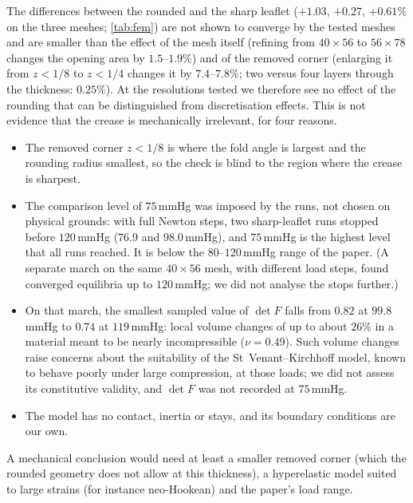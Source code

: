 \documentclass[11pt,a4paper]{article}
\theoremstyle{plain}
\theoremstyle{remark}
\begin{document}
The differences between the rounded and the sharp leaflet ($+1.03$, $+0.27$, $+0.61\%$ on the three meshes;
\cref{tab:fem}) are not shown to converge by the tested meshes and are smaller than the effect of the mesh itself (refining
from $40\times56$ to $56\times78$ changes the opening area by $1.5$--$1.9\%$) and of the removed corner (enlarging it from
$z<1/8$ to $z<1/4$ changes it by $7.4$--$7.8\%$; two versus four layers through the thickness: $0.25\%$). At the resolutions
tested we therefore see no effect of the rounding that can be distinguished from discretisation effects. This is not
evidence that the crease is mechanically irrelevant, for four reasons.
\begin{itemize}
\item The removed corner $z<1/8$ is where the fold angle is largest and the rounding radius smallest, so the check is blind
  to the region where the crease is sharpest.
\item The comparison level of $75$\,mmHg was imposed by the runs, not chosen on physical grounds: with full Newton steps,
  two sharp-leaflet runs stopped before $120$\,mmHg ($76.9$ and $98.0$\,mmHg), and $75$\,mmHg is the highest level that
  all runs reached. It is below the $80$--$120$\,mmHg range of the paper. (A separate march on the same $40\times56$ mesh,
  with different load steps, found converged equilibria up to $120$\,mmHg; we did not analyse the stops further.)
\item On that march, the smallest sampled value of $\det F$ falls from $0.82$ at $99.8$\,mmHg to $0.74$ at $119$\,mmHg:
  local volume changes of up to about $26\%$ in a material meant to be nearly incompressible ($\nu=0.49$). Such volume
  changes raise concerns about the suitability of the St~Venant--Kirchhoff model, known to behave poorly under large
  compression, at those loads; we did not assess its constitutive validity, and $\det F$ was not recorded at $75$\,mmHg.
\item The model has no contact, inertia or stays, and its boundary conditions are our own.
\end{itemize}
A mechanical conclusion would need at least a smaller removed corner (which the rounded geometry does not allow at this
thickness), a hyperelastic model suited to large strains (for instance neo-Hookean) and the paper's load range.

\end{document}
